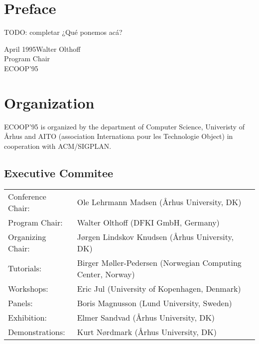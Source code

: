 \documentclass{llncs}
\begin{document}
%
\frontmatter          %
%
\pagestyle{headings}  %
%
\chapter*{Preface}
%
TODO: completar
¿Qué ponemos acá?

\vspace{1cm}
\begin{flushright}\noindent
April 1995\hfill Walter Olthoff\\
Program Chair\\
ECOOP'95
\end{flushright}
%
\chapter*{Organization}
ECOOP'95 is organized by the department of Computer Science, Univeristy
of \AA rhus and AITO (association Internationa pour les Technologie
Object) in cooperation with ACM/SIGPLAN.
%
\section*{Executive Commitee}
\begin{tabular}{@{}p{5cm}@{}p{7.2cm}@{}}
Conference Chair:&Ole Lehrmann Madsen (\AA rhus University, DK)\\
Program Chair:   &Walter Olthoff (DFKI GmbH, Germany)\\
Organizing Chair:&J\o rgen Lindskov Knudsen (\AA rhus University, DK)\\
Tutorials:&Birger M\o ller-Pedersen\hfil\break
(Norwegian Computing Center, Norway)\\
Workshops:&Eric Jul (University of Kopenhagen, Denmark)\\
Panels:&Boris Magnusson (Lund University, Sweden)\\
Exhibition:&Elmer Sandvad (\AA rhus University, DK)\\
Demonstrations:&Kurt N\o rdmark (\AA rhus University, DK)
\end{tabular}
%
\end{document}

